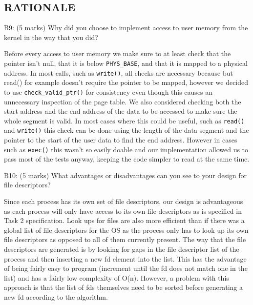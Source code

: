 \subsection*{RATIONALE}

\noindent B9: (5 marks)
Why did you choose to implement access to user memory from the
kernel in the way that you did?


Before every access to user memory we make sure to at least check that the pointer isn't null, that it is below \texttt{PHYS\_BASE}, and  that it is mapped to a physical address.
In most calls, such as \texttt{write()}, all checks are necessary because
but read() for example doesn't require the pointer to be mapped, however we decided to use \texttt{check\_valid\_ptr()} for consistency even though this causes an unnecessary inspection of the page table.
We also considered checking both the start address and the end address of the data to be accessed to make sure the whole segment is valid.
In most cases where this could be useful, such as \texttt{read()} and \texttt{write()} this check can be done using the length of the data segment and the pointer to the start of the user data to find the end address. However in cases such as \texttt{exec()} this wasn't so easily doable and our implementation allowed us to pass most of the tests anyway, keeping the code simpler to read at the same time. 



\noindent B10: (5 marks)
What advantages or disadvantages can you see to your design
for file descriptors?


Since each process has its own set of file descriptors, our design is advantageous as each process will only have access to its own file descriptors as is specified in Task 2 specification. Look ups for files are also more efficient than if there was a global list of file descriptors for the OS as the process only has to look up its own file descriptors as opposed to all of them currently present. The way that the file descriptors are generated is by looking for gaps in the file descriptor list of the process and then inserting a new fd element into the list. This has the advantage of being fairly easy to program (increment until the fd does not match one in the list) and has a fairly low complexity of O(n). However, a problem with this approach is that the list of fds themselves need to be sorted before generating a new fd according to the algorithm.

